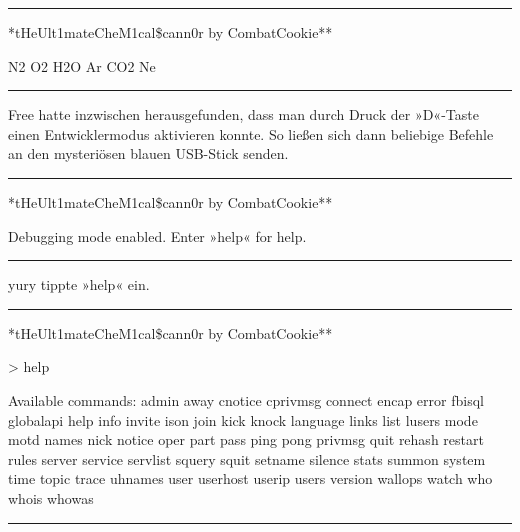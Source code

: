 \noindent \parbox{\textwidth}{ \vspace{3ex} \hrule \vspace{3ex}

    \begin{footnotesize}
    \begin{ttfamily}

\noindent **tHeUlt1mateCheM1cal\$cann0r by CombatCookie**

\noindent N2 O2 H2O Ar CO2 Ne

    \end{ttfamily}
    \end{footnotesize}

\vspace{3ex} \hrule \vspace{3ex} }

Free hatte inzwischen herausgefunden, dass man durch Druck der »D«-Taste einen Entwicklermodus aktivieren konnte. So ließen sich dann beliebige Befehle an den mysteriösen blauen USB-Stick senden.

\noindent \parbox{\textwidth}{ \vspace{3ex} \hrule \vspace{3ex}

    \begin{footnotesize}
    \begin{ttfamily}

\noindent **tHeUlt1mateCheM1cal\$cann0r by CombatCookie**

\noindent Debugging mode enabled. Enter »help« for help.

    \end{ttfamily}
    \end{footnotesize}

\vspace{3ex} \hrule \vspace{3ex} }

yury tippte »help« ein.

\noindent \parbox{\textwidth}{ \vspace{3ex} \hrule \vspace{3ex}

    \begin{footnotesize}
    \begin{ttfamily}

\noindent **tHeUlt1mateCheM1cal\$cann0r by CombatCookie**

\noindent > help

\noindent Available commands: admin away cnotice cprivmsg connect encap error fbisql globalapi help info invite ison join kick knock language links list lusers mode motd names nick notice oper part pass ping pong privmsg quit rehash restart rules server service servlist squery squit setname silence stats summon system time topic trace uhnames user userhost userip users version wallops watch who whois whowas

    \end{ttfamily}
    \end{footnotesize}

\vspace{3ex} \hrule \vspace{3ex} }


